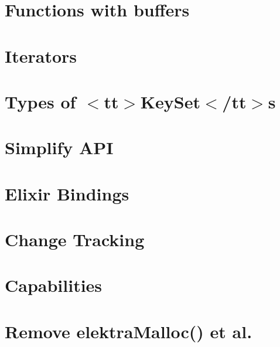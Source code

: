 \let\mypdfximage\pdfximage\def\pdfximage{\immediate\mypdfximage}\documentclass[twoside]{book}
\newcommand{\+}{\discretionary{\mbox{\scriptsize$\hookleftarrow$}}{}{}}
\begin{document}
\chapter{Functions with buffers}
\label{doc_decisions_2_solutions_clear_functions_with_buffers_md}

\chapter{Iterators}
\label{doc_decisions_2_solutions_clear_iterators_md}

\chapter{Types of $<$tt$>$Key\+Set$<$/tt$>$s}
\label{doc_decisions_2_solutions_clear_keyset_types_md}

\chapter{Simplify API}
\label{doc_decisions_2_solutions_clear_simplify_api_md}

\chapter{Elixir Bindings}
\label{doc_decisions_3_decided_elixir_bindings_md}

\chapter{Change Tracking}
\label{doc_decisions_3_in_review_change_tracking_md}

\chapter{Capabilities}
\label{doc_decisions_4_decided_capabilities_md}

\chapter{Remove elektra\+Malloc() et al.}
\label{doc_decisions_4_decided_elektra_malloc_md}

\end{document}
